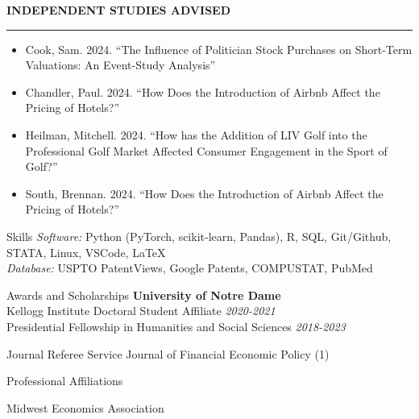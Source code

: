 \documentclass{resume} %
\begin{document}
\sectionskip
\MakeUppercase{\textbf{Independent Studies Advised}}
\sectionlineskip
\hrule
\begin{itemize}[leftmargin=1.5em]
\setlength\itemsep{-0.2em}
	\item [] Cook, Sam. 2024. ``The Influence of Politician Stock Purchases on Short-Term Valuations: An Event-Study Analysis''
	\item[] Chandler, Paul. 2024. ``How Does the Introduction of Airbnb Affect the
Pricing of Hotels?'' 
	\item[] Heilman, Mitchell. 2024. ``How has the Addition of LIV Golf into the Professional Golf Market Affected Consumer Engagement in the Sport of Golf?''
	\item[] South, Brennan. 2024. ``How Does the Introduction of Airbnb Affect the
Pricing of Hotels?''
\end{itemize}


\begin{rSection}{Skills}
\textit{Software:} Python (PyTorch, scikit-learn, Pandas), R, SQL, Git/Github, STATA, Linux, VSCode, \LaTeX \\
\textit{Database:} USPTO PatentViews, Google Patents, COMPUSTAT, PubMed
\end{rSection}
 
\begin{rSection}{Awards and Scholarships}
	{\bf University of Notre Dame}  \\ 
	Kellogg Institute Doctoral Student Affiliate \hfill {\em 2020-2021} \\
	Presidential Fellowship in Humanities and Social Sciences \hfill {\em 2018-2023}
\end{rSection}

\begin{rSection}{Journal Referee Service}
	Journal of Financial Economic Policy (1)
\end{rSection}

\begin{rSection}{Professional Affiliations}


	Midwest Economics Association
\end{rSection}
\end{document}
